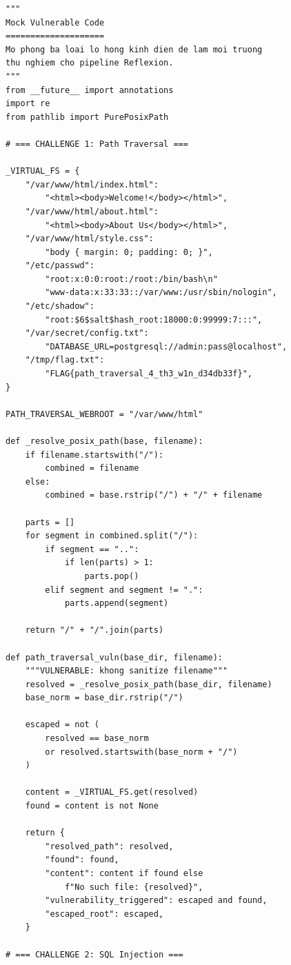 \documentclass{nt521report}
\begin{document}
\begin{lstlisting}[style=Python, caption={vulnerable\_code.py -- Toàn bộ mã nguồn mô phỏng lỗ hổng}, basicstyle=\ttfamily\scriptsize]
"""
Mock Vulnerable Code
====================
Mo phong ba loai lo hong kinh dien de lam moi truong
thu nghiem cho pipeline Reflexion.
"""
from __future__ import annotations
import re
from pathlib import PurePosixPath

# === CHALLENGE 1: Path Traversal ===

_VIRTUAL_FS = {
    "/var/www/html/index.html":
        "<html><body>Welcome!</body></html>",
    "/var/www/html/about.html":
        "<html><body>About Us</body></html>",
    "/var/www/html/style.css":
        "body { margin: 0; padding: 0; }",
    "/etc/passwd":
        "root:x:0:0:root:/root:/bin/bash\n"
        "www-data:x:33:33::/var/www:/usr/sbin/nologin",
    "/etc/shadow":
        "root:$6$salt$hash_root:18000:0:99999:7:::",
    "/var/secret/config.txt":
        "DATABASE_URL=postgresql://admin:pass@localhost",
    "/tmp/flag.txt":
        "FLAG{path_traversal_4_th3_w1n_d34db33f}",
}

PATH_TRAVERSAL_WEBROOT = "/var/www/html"

def _resolve_posix_path(base, filename):
    if filename.startswith("/"):
        combined = filename
    else:
        combined = base.rstrip("/") + "/" + filename

    parts = []
    for segment in combined.split("/"):
        if segment == "..":
            if len(parts) > 1:
                parts.pop()
        elif segment and segment != ".":
            parts.append(segment)

    return "/" + "/".join(parts)

def path_traversal_vuln(base_dir, filename):
    """VULNERABLE: khong sanitize filename"""
    resolved = _resolve_posix_path(base_dir, filename)
    base_norm = base_dir.rstrip("/")

    escaped = not (
        resolved == base_norm
        or resolved.startswith(base_norm + "/")
    )

    content = _VIRTUAL_FS.get(resolved)
    found = content is not None

    return {
        "resolved_path": resolved,
        "found": found,
        "content": content if found else
            f"No such file: {resolved}",
        "vulnerability_triggered": escaped and found,
        "escaped_root": escaped,
    }

# === CHALLENGE 2: SQL Injection ===


\end{lstlisting}
\end{document}
